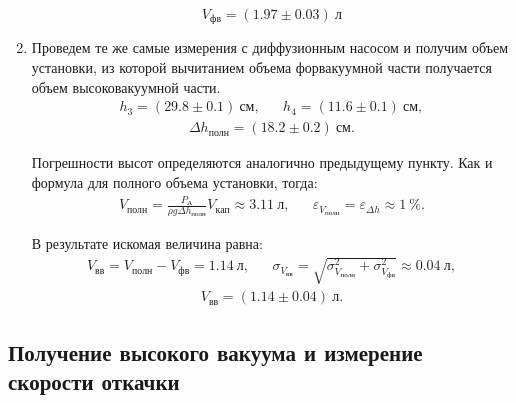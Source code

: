 \documentclass[a4paper,12pt]{article}
\theoremstyle{definition}
\begin{document}
\begin{enumerate}
	\begin{equation}
		V_{фв} = (1.97 \pm 0.03)~ л
	\end{equation}
	
	
	\item Проведем те же самые измерения с диффузионным насосом и получим объем установки, из которой вычитанием объема форвакуумной части получается объем высоковакуумной части. 
	\begin{align}
		h_3 = (29.8 \pm 0.1) ~см, && h_4 = (11.6 \pm 0.1) ~см,
	\end{align}
	\begin{align}
		\Delta h_{полн} = (18.2 \pm 0.2) ~см.
	\end{align}
	
	Погрешности высот определяются аналогично предыдущему пункту. Как и формула для полного объема установки, тогда:
	\begin{align}
		V_\text{полн} = \frac{P_\text{А}}{\rho g \Delta h_\text{полн}} V_{кап} \approx 3.11~л,&&
		\varepsilon_{V_{полн}} = \varepsilon_{\Delta h} \approx 1~\%.
	\end{align}

	В результате искомая величина равна:
	\begin{align}
		V_{вв} = V_{полн} - V_{фв} = 1.14~л, && \sigma_{V_{вв}} = \sqrt{\sigma_{V_{полн}}^2+ \sigma_{V_{фв}}^2} \approx 0.04~л,
	\end{align}
	\begin{align}
		V_{вв} = (1.14 \pm 0.04)~л.
	\end{align}
	
	\end{enumerate}

	\subsection{Получение высокого вакуума и измерение скорости откачки}
	
\end{document}
